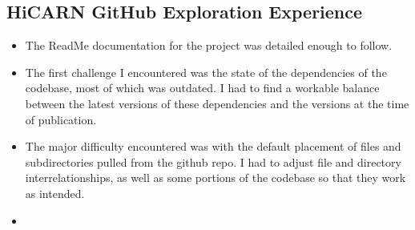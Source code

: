 \documentclass{article}
\begin{document}
\subsection{HiCARN GitHub Exploration Experience}
\begin{itemize}
    \item The ReadMe documentation for the project was detailed enough to follow.
    \item The first challenge I encountered was the state of the dependencies of the codebase, most of which was outdated. I had to find a workable balance between the latest versions of these dependencies and the versions at the time of publication.
    \item The major difficulty encountered was with the default placement of files and subdirectories pulled from the github repo. I had to adjust file and directory interrelationships, as well as some portions of the codebase so that they work as intended.
    \item 
\end{itemize}
\end{document}
